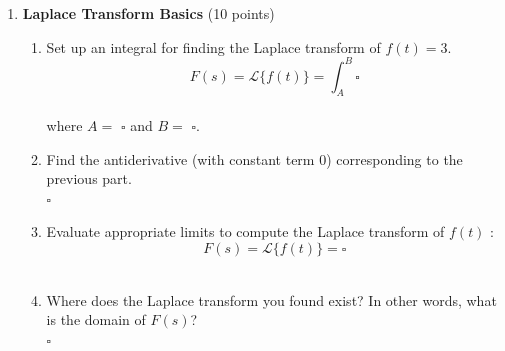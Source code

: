 \begin{enumerate}
  \item \textbf{Laplace Transform Basics} (10 points)\\
  \begin{enumerate}[label=(\alph*)]
    \item Set up an integral for finding the Laplace transform of $f(t)=3$.\\
    $$
    F(s)=\mathcal{L}\{f(t)\}=\int_A^B \square
    $$\\
    where $A=$ $\square$ and $B=$ $\square$.\\
    \begin{subanswer}
    \end{subanswer}
    \item Find the antiderivative (with constant term 0) corresponding to the previous part.\\
    $\square$\\
    \begin{subanswer}
    \end{subanswer}
    \item Evaluate appropriate limits to compute the Laplace transform of $f(t)$ :\\
    $$
    F(s)=\mathcal{L}\{f(t)\}=\square
    $$\\
    \begin{subanswer}
    \end{subanswer}
    \item Where does the Laplace transform you found exist? In other words, what is the domain of $F(s)$?\\
    $\square$\\
    \begin{subanswer}
    \end{subanswer}
  \end{enumerate}


\end{enumerate}
